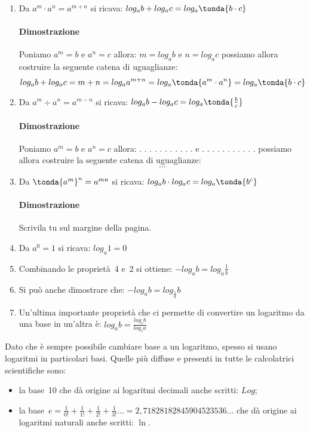 \begin{enumerate} 
 \item Da \quad \(a^m \cdot a^n = a^{m+n}\) \quad si ricava: \quad
 \(log_a {b} + log_a {c} = log_a \tonda{b \cdot c} \)
\paragraph{Dimostrazione} 
Poniamo \(a^m = b\) e \(a^n = c\) 
allora: \(m = log_a {b}\) e \(n = log_a {c}\) possiamo allora costruire la 
seguente catena di uguaglianze:
\[log_a {b} + log_a {c} =
m + n =  
log_a {a^{m + n}} =
log_a \tonda{{a^m \cdot a^n}}  =
log_a \tonda{{b \cdot c}}\]
 \item Da \quad \(a^m \div a^n = a^{m-n}\) \quad si ricava: \quad
 \(log_a {b} - log_a {c} = log_a \tonda{\frac{b}{c}}\)
\paragraph{Dimostrazione} 
Poniamo \(a^m = b\) e \(a^n = c\) 
allora: . . . . . . . . . . . e . . . . . . . . . . . 
possiamo allora costruire la seguente catena di uguaglianze:
\[\dots\]
 \item Da \quad \(\tonda{a^m}^n = a^{mn}\) \quad si ricava: \quad
 \(log_a {b} \cdot log_a {c} = log_a \tonda{{b}^{c}} \)
\paragraph{Dimostrazione} Scrivila tu sul margine della pagina.
 \item Da \quad \(a^0 = 1\) \quad si ricava: \quad
 \(log_a {1} = 0\)
 \item Combinando le proprietà~4 e~2 si ottiene: \quad
 \(-log_a {b} = log_a {\frac{1}{b}}\)
 \item Si può anche dimostrare che: \quad
 \(-log_a {b} = log_{\frac{1}{a}} b\)
 \item Un'ultima importante proprietà che ci permette di convertire un 
logaritmo da una base in un'altra è: \quad
 \(log_a {b} = \frac{log_c b}{log_c a}\)
\end{enumerate}

\noindent
Dato che è sempre possibile cambiare base a un logaritmo, spesso si 
usano logaritmi in particolari basi. Quelle più diffuse e presenti in tutte le 
calcolatrici scientifiche sono: 
\begin{itemize}
 \item 
la base~10 che dà origine ai logaritmi decimali anche scritti: \(Log\);
 \item 
la base~\(e = \frac{1}{0!} + \frac{1}{1!} + \frac{1}{2!} + \frac{1}{3!} \dots = 
2,71828 18284 59045 23536\dots \) che dà origine ai logaritmi naturali anche 
scritti: \(\ln\).
\end{itemize}

